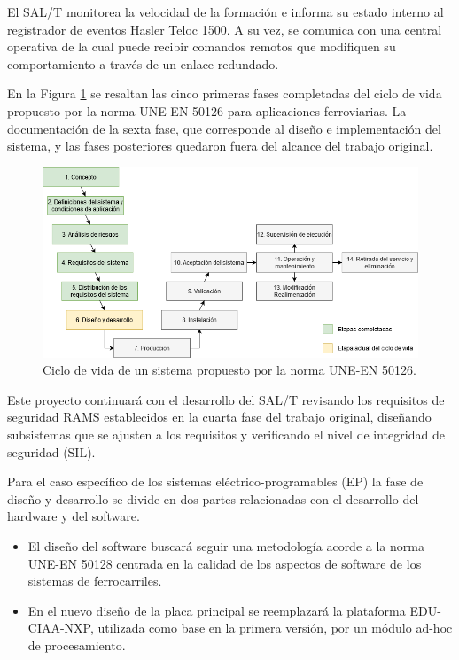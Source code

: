 \documentclass[11pt]{charter}
\begin{document}
El SAL/T monitorea la velocidad de la formación e informa su estado interno al registrador de eventos Hasler Teloc 1500.
A su vez, se comunica con una central operativa de la cual puede recibir comandos remotos que modifiquen su comportamiento
a través de un enlace redundado.

En la Figura \ref{fig:ciclo_de_vida_50126} se resaltan las cinco primeras fases completadas del ciclo de vida propuesto 
por la norma UNE-EN 50126 para aplicaciones ferroviarias. La documentación de la sexta fase, que corresponde al diseño 
e implementación del sistema, y las fases posteriores quedaron fuera del alcance del trabajo original.

\vspace{10px}

\begin{figure}[htpb]
\centering 
\includegraphics[width=1\textwidth]{./Figuras/ciclo_de_vida_50126.png}
\caption{Ciclo de vida de un sistema propuesto por la norma UNE-EN 50126.}
\label{fig:ciclo_de_vida_50126}
\end{figure}

\vspace{10px}

Este proyecto continuará con el desarrollo del SAL/T revisando los requisitos de seguridad RAMS establecidos en la cuarta fase 
del trabajo original, diseñando subsistemas que se ajusten a los requisitos y verificando el nivel de integridad 
de seguridad (SIL).

Para el caso específico de los sistemas eléctrico-programables (EP) la fase de diseño y desarrollo se divide en dos 
partes relacionadas con el desarrollo del hardware y del software.

\begin{itemize}
\item El diseño del software buscará seguir una metodología acorde a la norma UNE-EN 50128 centrada en la calidad de los 
aspectos de software de los sistemas de ferrocarriles.
\item En el nuevo diseño de la placa principal se reemplazará la plataforma EDU-CIAA-NXP, utilizada como base en la primera 
versión, por un módulo ad-hoc de procesamiento.
\end{itemize}
\end{document}
